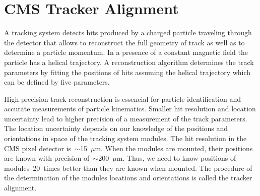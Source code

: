\chapter{CMS Tracker Alignment} %
\label{sec:alignment}
A tracking system detects hits produced by a charged particle traveling through the detector that allows to reconstruct the full geometry of track as well as to determine a particle momentum. In a presence of a constant magnetic field the particle has a helical trajectory. A reconstruction algorithm determines the track parameters by fitting the positions of hits assuming the helical trajectory which can be defined by five parameters.

High precision track reconstruction is essencial for particle identification and accurate measurements of particle kinematics. Smaller hit resolution and location uncertainty lead to higher precision of a measurement of the track parameters. The location uncertainty depends on our knowledge of the positions and orientations in space of the tracking system modules. The hit resolution in the CMS pixel detector is~$\sim$15~$\mu$m. When the modules are mounted, their positions are known with precision of~$\sim$200~$\mu$m. Thus, we need to know positions of modules~20~times better than they are known when mounted. The procedure of the determination of the modules locations and orientations is called the tracker alignment.

